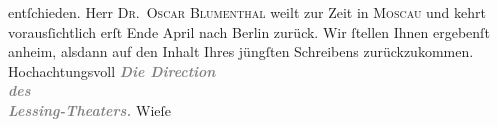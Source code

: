 \begin{ledgroupsized}[t]{13cm}
                    entſchieden. Herr \textsc{Dr. Oscar
                            Blumenthal} weilt zur Zeit in \textsc{Moscau} und kehrt vorausſichtlich erſt Ende April nach Berlin zurück. Wir ſtellen Ihnen ergebenſt anheim, alsdann
                    auf den Inhalt Ihres jüngſten Schreibens zurückzukommen.\pend
           \pstart
           Hochachtungsvoll\pend
           \pstart
           \raggedleft{}\textcolor{gray}{\textbf{\textit{Die Direction}}}{\\}\textcolor{gray}{\textbf{\textit{des}}}{\\}\textcolor{gray}{\textbf{\textit{Lessing-Theaters.}}}\pend
           \pstart \spacefill\mbox{Wieſe}\pend{}
         
         \endnumbering{}\end{ledgroupsized}  \newcommand{\dateiname}{L00307}\newcommand{\titel}{Gerhard Wiese an Arthur Schnitzler, 21. 3. 1894}\newcommand{\editorInnen}{Martin Anton Müller und Gerd-Hermann Susen}
      